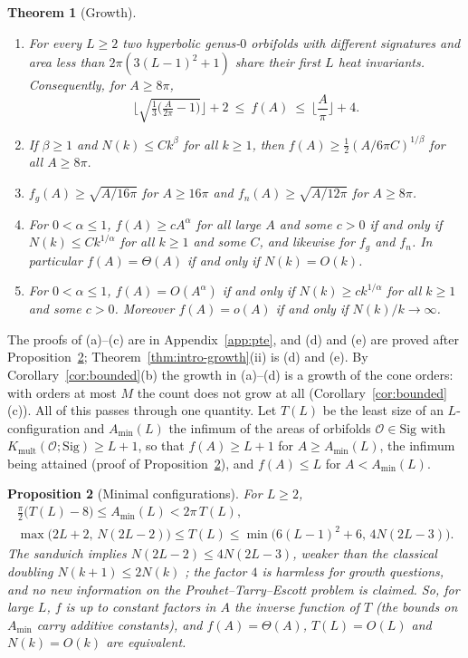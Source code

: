 \documentclass[pdflatex,sn-mathphys-num]{sn-jnl}
\theoremstyle{thmstyleone}%
\newtheorem{theorem}{Theorem}[section]%
\newtheorem{proposition}[theorem]{Proposition}%
\theoremstyle{thmstylethree}%
\newcommand{\Orb}{\mathcal{O}}
\newcommand{\Sig}{\mathrm{Sig}}
\newcommand{\Kmult}{K_{\mathrm{mult}}}
\begin{document}
\begin{theorem}[Growth]\label{thm:growth}
\leavevmode
\begin{enumerate}[label=(\alph*)]
\item For every $L\ge2$ two hyperbolic genus-$0$ orbifolds with different signatures and area less than $2\pi(3(L-1)^2+1)$ share their first $L$ heat invariants. Consequently, for $A\ge8\pi$,
\[
  \Big\lfloor\sqrt{\tfrac13\big(\tfrac A{2\pi}-1\big)}\Big\rfloor+2\ \le\ f(A)\ \le\ \Big\lfloor\frac A\pi\Big\rfloor+4 .
\]
\item If $\beta\ge1$ and $N(k)\le Ck^\beta$ for all $k\ge1$, then $f(A)\ge\frac12(A/6\pi C)^{1/\beta}$ for all $A\ge8\pi$.
\item $f_g(A)\ge\sqrt{A/16\pi}$ for $A\ge16\pi$ and $f_n(A)\ge\sqrt{A/12\pi}$ for $A\ge8\pi$.
\item For $0<\alpha\le1$, $f(A)\ge cA^\alpha$ for all large $A$ and some $c>0$ if and only if $N(k)\le Ck^{1/\alpha}$ for all $k\ge1$ and some $C$, and likewise for $f_g$ and $f_n$. In particular $f(A)=\Theta(A)$ if and only if $N(k)=O(k)$.
\item For $0<\alpha\le1$, $f(A)=O(A^\alpha)$ if and only if $N(k)\ge ck^{1/\alpha}$ for all $k\ge1$ and some $c>0$. Moreover $f(A)=o(A)$ if and only if $N(k)/k\to\infty$.
\end{enumerate}
\end{theorem}

The proofs of (a)--(c) are in Appendix~\ref{app:pte}, and (d) and (e) are proved after Proposition~\ref{prop:Tmin}; Theorem~\ref{thm:intro-growth}(ii) is (d) and (e). By Corollary~\ref{cor:bounded}(b) the growth in (a)--(d) is a growth of the cone orders: with orders at most $M$ the count does not grow at all (Corollary~\ref{cor:bounded}(c)). All of this passes through one quantity. Let $T(L)$ be the least size of an $L$-configuration and $A_{\min}(L)$ the infimum of the areas of orbifolds $\Orb\in\Sig$ with $\Kmult(\Orb;\Sig)\ge L+1$, so that $f(A)\ge L+1$ for $A\ge A_{\min}(L)$, the infimum being attained (proof of Proposition~\ref{prop:Tmin}), and $f(A)\le L$ for $A<A_{\min}(L)$.

\begin{proposition}[Minimal configurations]\label{prop:Tmin}
For $L\ge2$,
\begin{gather*}
  \tfrac\pi2\big(T(L)-8\big)\le A_{\min}(L)<2\pi\,T(L),\\
  \max\big(2L+2,\,N(2L-2)\big)\le T(L)\le\min\big(6(L-1)^2+6,\,4N(2L-3)\big).
\end{gather*}
The sandwich implies $N(2L-2)\le4N(2L-3)$, weaker than the classical doubling $N(k+1)\le2N(k)$ \cite{borweiningalls1994}; the factor $4$ is harmless for growth questions, and no new information on the Prouhet--Tarry--Escott problem is claimed. So, for large $L$, $f$ is up to constant factors in $A$ the inverse function of $T$ (the bounds on $A_{\min}$ carry additive constants), and $f(A)=\Theta(A)$, $T(L)=O(L)$ and $N(k)=O(k)$ are equivalent.
\end{proposition}
\end{document}
